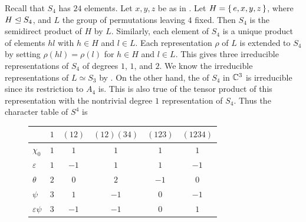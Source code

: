 \documentclass[letterpaper, 11pt, oneside]{book}
\begin{document}
\begin{ex}
  Recall that $S_{4}$ has $24$ elements.
  Let $x, y, z$ be as in .
  Let $H = \set{e, x, y, z}$, where $H \trianglelefteq S_{4}$, and $L$ the group of permutations leaving $4$ fixed.
  Then $S_{4}$ is the semidirect product of $H$ by $L$.
  Similarly, each element of $S_{4}$ is a unique product of elements $hl$ with $h \in H$ and $l \in L$.
  Each representation $\rho$ of $L$ is extended to $S_{4}$ by setting $\rho(hl) = \rho(l)$ for $h \in H$ and $l \in L$.
  This gives three irreducible representations of $S_{4}$ of degrees $1$, $1$, and $2$.
  We know the irreducible representations of $L \simeq S_{3}$ by .
  On the other hand, the  of $S_{4}$ in $\mathbb{C}^{3}$ is irreducible since its restriction to $A_{4}$ is.
  This is also true of the tensor product of this representation with the nontrivial degree $1$ representation of $S_{4}$.
  Thus the character table of $S^{4}$ is
  \begin{figure}[h]
    \centering
    \begin{tabular}{l|ccccc}
      & $1$ & $(12)$ & $(12)(34)$ & $(123)$ & $(1234)$ \\\hline
      $\chi_{0}$ & $1$ & $1$ & $1$ & $1$ & $1$ \\
      $\varepsilon$ & $1$ & $-1$ & $1$ & $1$ & $-1$ \\
      $\theta$ & $2$ & $0$ & $2$ & $-1$ & $0$ \\
      $\psi$ & $3$ & $1$ & $-1$ & $0$ & $-1$ \\
      $\varepsilon \psi$ & $3$ & $-1$ & $-1$ & $0$ & $1$
    \end{tabular}
  \end{figure}
\end{ex}

\printbibliography
\end{document}
